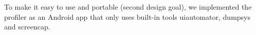 To make it easy to use and portable (second design goal),
we implemented the \name profiler as an Android
app that only
uses built-in tools uiautomator,
dumpsys and screencap.
\begin{figure}[tp]
	\begin{subfigure}[]{0.30\columnwidth}

\end{subfigure}
\end{figure}
